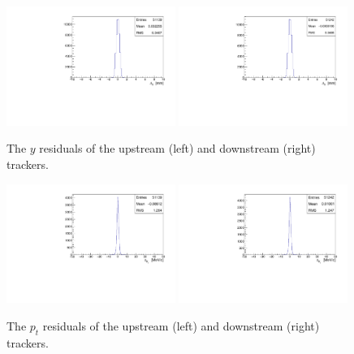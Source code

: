     \begin{figure}[p]
    \begin{center}
      \includegraphics[width=0.49\textwidth, angle=0]{08-Performance/upstream_y_residual.pdf}
      \includegraphics[width=0.49\textwidth, angle=0]{08-Performance/downstream_y_residual.pdf}
      \caption{\label{fig:YResidKalman} The $y$ residuals of the upstream (left) and downstream (right) trackers.}
    \end{center}
  \end{figure}
  
  
  \begin{figure}[p]
    \begin{center}
      \includegraphics[width=0.49\textwidth, angle=0]{08-Performance/upstream_pt_residual.pdf}
      \includegraphics[width=0.49\textwidth, angle=0]{08-Performance/downstream_pt_residual.pdf}
      \caption{\label{fig:PtResidKalman} The $p_{t}$ residuals of the upstream (left) and downstream (right) trackers.}
    \end{center}
  \end{figure}
  
